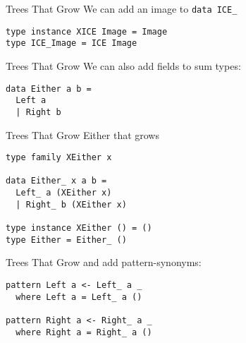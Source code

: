 \begin{frame}[fragile]
\begin{block}{Trees That Grow}
We can add an image to \lstinline{data ICE_}
\begin{lstlisting}[style=haskell]
type instance XICE Image = Image
type ICE_Image = ICE Image
\end{lstlisting}
\end{block}
\end{frame}

\begin{frame}[fragile]
\begin{block}{Trees That Grow}
We can also add fields to sum types:
\begin{lstlisting}[style=haskell]
data Either a b =
  Left a
  | Right b
\end{lstlisting}
\end{block}
\end{frame}

\begin{frame}[fragile]
\begin{block}{Trees That Grow}
Either that grows
\begin{lstlisting}[style=haskell]
type family XEither x

data Either_ x a b =
  Left_ a (XEither x)
  | Right_ b (XEither x)

type instance XEither () = ()
type Either = Either_ ()
\end{lstlisting}
\end{block}
\end{frame}

\begin{frame}[fragile]
\begin{block}{Trees That Grow}
and add pattern-synonyms:
\begin{lstlisting}[style=haskell]
pattern Left a <- Left_ a _
  where Left a = Left_ a ()

pattern Right a <- Right_ a _
  where Right a = Right_ a ()
\end{lstlisting}
\end{block}
\end{frame}
 
